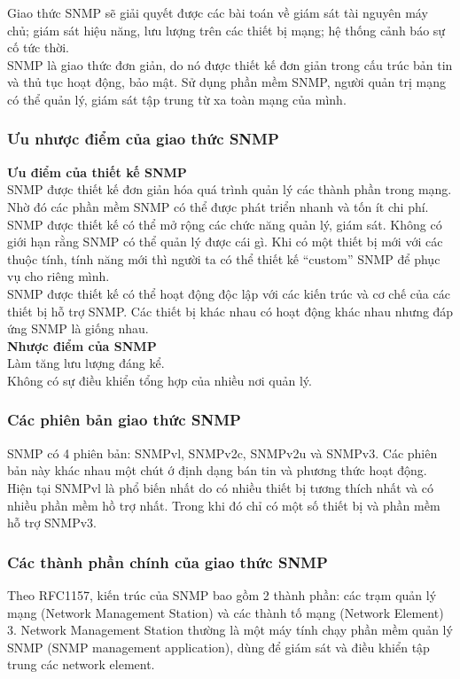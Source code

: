 \documentclass[12pt,oneside,a4paper]{article}
\begin{document}
Giao thức SNMP sẽ giải quyết được các bài toán về giám sát tài nguyên máy chủ; giám sát hiệu năng, lưu lượng trên các thiết bị mạng; hệ thống cảnh báo sự cố tức thời.\\

SNMP là giao thức đơn giản, do nó được thiết kế đơn giản trong cấu trúc bản tin và thủ tục hoạt động, bảo mật. Sử dụng phần mềm SNMP, người quản trị mạng có thể quản lý, giám sát tập trung từ xa toàn mạng của mình.
\subsubsection{Ưu nhược điểm của giao thức SNMP}
\textbf{Ưu điểm của thiết kế SNMP}\\

SNMP được thiết kế đơn giản hóa quá trình quản lý các thành phần trong mạng. Nhờ đó các phần mềm SNMP có thể được phát triển nhanh và tốn ít chi phí.\\

SNMP được thiết kế có thể mở rộng các chức năng quản lý, giám sát. Không có giới hạn rằng SNMP có thể quản lý được cái gì. Khi có một thiết bị mới với các thuộc tính, tính năng mới thì người ta có thể thiết kế “custom” SNMP để phục vụ cho riêng mình.\\

SNMP được thiết kế có thể hoạt động độc lập với các kiến trúc và cơ chế của các thiết bị hỗ trợ SNMP. Các thiết bị khác nhau có hoạt động khác nhau nhưng đáp ứng SNMP là giống nhau.\\

\textbf{Nhược điểm của SNMP}\\

Làm tăng lưu lượng đáng kể.\\

Không có sự điều khiển tổng hợp của nhiều nơi quản lý.\\
\subsubsection{Các phiên bản giao thức SNMP}
SNMP có 4 phiên bản: SNMPvl, SNMPv2c, SNMPv2u và SNMPv3. Các phiên bản này khác nhau một chút ớ định dạng bán tin và phương thức hoạt động. Hiện tại SNMPvl là phổ biến nhất do có nhiều thiết bị tương thích nhất và có nhiều phần mềm hồ trợ nhất. Trong khi đó chỉ có một số thiết bị và phần mềm hỗ trợ SNMPv3. 
\subsubsection{Các thành phần chính của giao thức SNMP}
Theo RFC1157, kiến trúc của SNMP bao gồm 2 thành phần: các trạm quản lý mạng (Network Management Station) và các thành tố mạng (Network Element) 3. Network Management Station thường là một máy tính chạy phần mềm quản lý SNMP (SNMP management application), dùng để giám sát và điều khiển tập trung các network element.
\end{document}

